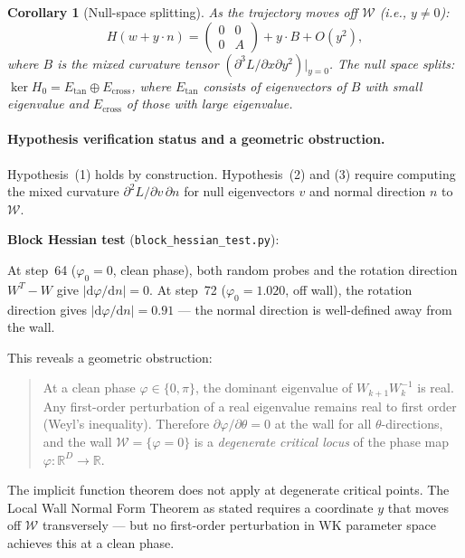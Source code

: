\documentclass[11pt]{amsart}
\newtheorem{corollary}[theorem]{Corollary}
\begin{document}
\begin{corollary}[Null-space splitting]
\label{cor:splitting}
As the trajectory moves off $\mathcal{W}$ (i.e., $y \neq 0$):
\[
  H(w + y\cdot n) = \begin{pmatrix} 0 & 0 \\ 0 & A \end{pmatrix}
  + y \cdot B + O(y^2),
\]
where $B$ is the mixed curvature tensor $(\partial^3 L/\partial x \partial y^2)|_{y=0}$.
The null space splits:
$\ker H_0 = E_\mathrm{tan} \oplus E_\mathrm{cross}$,
where $E_\mathrm{tan}$ consists of eigenvectors of $B$ with small eigenvalue
and $E_\mathrm{cross}$ of those with large eigenvalue.
\end{corollary}

\paragraph{Hypothesis verification status and a geometric obstruction.}

Hypothesis~(1) holds by construction.
Hypothesis~(2) and (3) require computing the mixed curvature
$\partial^2 L/\partial v\,\partial n$ for null eigenvectors $v$
and normal direction $n$ to $\mathcal{W}$.

\textbf{Block Hessian test} (\texttt{block\_hessian\_test.py}):

At step~64 ($\varphi_0 = 0$, clean phase), both random probes and the
rotation direction $W^T - W$ give $|\mathrm{d}\varphi/\mathrm{d}n| = 0$.
At step~72 ($\varphi_0 = 1.020$, off wall), the rotation direction gives
$|\mathrm{d}\varphi/\mathrm{d}n| = 0.91$ --- the normal direction is
well-defined away from the wall.

This reveals a geometric obstruction:
\begin{quote}
At a clean phase $\varphi \in \{0,\pi\}$, the dominant eigenvalue of
$W_{k+1}W_k^{-1}$ is real. Any first-order perturbation of a real
eigenvalue remains real to first order (Weyl's inequality).
Therefore $\partial\varphi/\partial\theta = 0$ at the wall for all
$\theta$-directions, and the wall $\mathcal{W} = \{\varphi = 0\}$
is a \emph{degenerate critical locus} of the phase map
$\varphi: \mathbb{R}^D \to \mathbb{R}$.
\end{quote}

The implicit function theorem does not apply at degenerate critical points.
The Local Wall Normal Form Theorem as stated requires a coordinate $y$
that moves off $\mathcal{W}$ transversely --- but no first-order
perturbation in WK parameter space achieves this at a clean phase.
\end{document}
